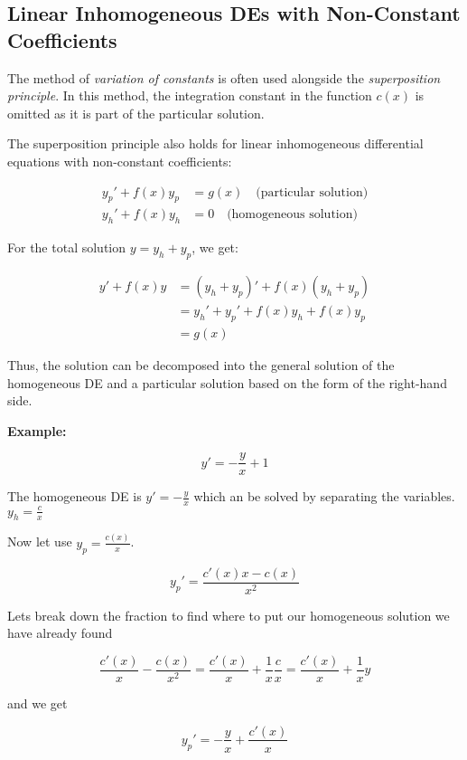 \subsection{Linear Inhomogeneous DEs with Non-Constant Coefficients}

The method of \emph{variation of constants} is often used alongside the \emph{superposition principle}. In this method, the integration constant in the function \( c(x) \) is omitted as it is part of the particular solution.
\vspace{\baselineskip}

The superposition principle also holds for linear inhomogeneous differential equations with non-constant coefficients:

\begin{align*}
y_p' + f(x)y_p &= g(x) \quad \text{(particular solution)} \\
y_h' + f(x)y_h &= 0 \quad \text{(homogeneous solution)}
\end{align*}

For the total solution \( y = y_h + y_p \), we get:

\begin{align*}
y' + f(x)y 
&= (y_h + y_p)' + f(x)(y_h + y_p) \\
&= y_h' + y_p' + f(x)y_h + f(x)y_p \\
&= g(x)
\end{align*}

Thus, the solution can be decomposed into the general solution of the homogeneous DE and a particular solution based on the form of the right-hand side.
\vspace{\baselineskip}

\textbf{Example: }

\[y' = -\frac{y}{x} + 1\]

The homogeneous DE is \(y' = -\frac{y}{x}\) which an be solved by separating the variables.
\(y_h = \frac{c}{x}\)

Now let use \(y_p = \frac{c(x)}{x}\).

\[
y_{p}' = \frac{c'(x)x - c(x)}{x^2}
\]

Lets break down the fraction to find where to put our homogeneous solution we have already found

\[
\frac{c'(x)}{x} - \frac{c(x)}{x^2} = \frac{c'(x)}{x} + \frac{1}{x}\frac{c}{x} = \frac{c'(x)}{x} + \frac{1}{x}y
\]

and we get

\[
y_{p}' = -\frac{y}{x} + \frac{c'(x)}{x} 
\]

